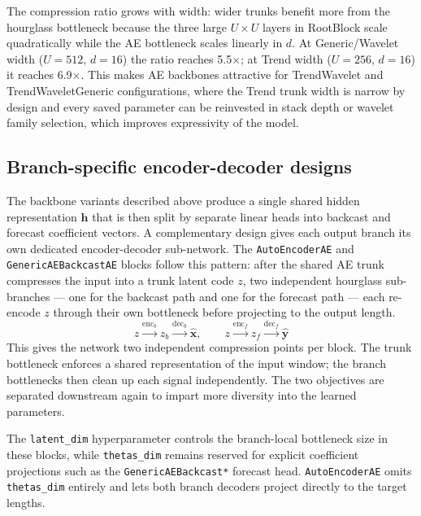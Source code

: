 \documentclass[11pt,a4paper]{article}
\begin{document}
The compression ratio grows with width: wider trunks benefit more from the hourglass bottleneck because the three large $U \times U$ layers in RootBlock scale quadratically while the AE bottleneck scales linearly in $d$. At Generic/Wavelet width ($U = 512$, $d = 16$) the ratio reaches 5.5$\times$; at Trend width ($U = 256$, $d = 16$) it reaches 6.9$\times$. This makes AE backbones attractive for TrendWavelet and TrendWaveletGeneric configurations, where the Trend trunk width is narrow by design and every saved parameter can be reinvested in stack depth or wavelet family selection, which improves expressivity of the model.

\subsection{Branch-specific encoder-decoder designs}

The backbone variants described above produce a single shared hidden representation $\mathbf{h}$ that is then split by separate linear heads into backcast and forecast coefficient vectors. A complementary design gives each output branch its own dedicated encoder-decoder sub-network. The \texttt{AutoEncoderAE} and \texttt{GenericAEBackcastAE} blocks follow this pattern: after the shared AE trunk compresses the input into a trunk latent code $z$, two independent hourglass sub-branches --- one for the backcast path and one for the forecast path --- each re-encode $z$ through their own bottleneck before projecting to the output length.
\begin{equation*}
z \xrightarrow{\text{enc}_b} z_b \xrightarrow{\text{dec}_b} \hat{\mathbf{x}}, \qquad z \xrightarrow{\text{enc}_f} z_f \xrightarrow{\text{dec}_f} \hat{\mathbf{y}}
\end{equation*}
This gives the network two independent compression points per block. The trunk bottleneck enforces a shared representation of the input window; the branch bottlenecks then clean up each signal independently. The two objectives are separated downstream again to impart more diversity into the learned parameters.

The \texttt{latent\_dim} hyperparameter controls the branch-local bottleneck size in these blocks, while \texttt{thetas\_dim} remains reserved for explicit coefficient projections such as the \texttt{GenericAEBackcast*} forecast head. \texttt{AutoEncoderAE} omits \texttt{thetas\_dim} entirely and lets both branch decoders project directly to the target lengths.
\end{document}

